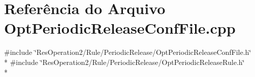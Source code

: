 \section{Referência do Arquivo Opt\+Periodic\+Release\+Conf\+File.\+cpp}
\label{_opt_periodic_release_conf_file_8cpp}
{\ttfamily \#include \char`\"{}Res\+Operation2/\+Rule/\+Periodic\+Release/\+Opt\+Periodic\+Release\+Conf\+File.\+h\char`\"{}}\\*
{\ttfamily \#include \char`\"{}Res\+Operation2/\+Rule/\+Periodic\+Release/\+Opt\+Periodic\+Release\+Rule.\+h\char`\"{}}\\*
